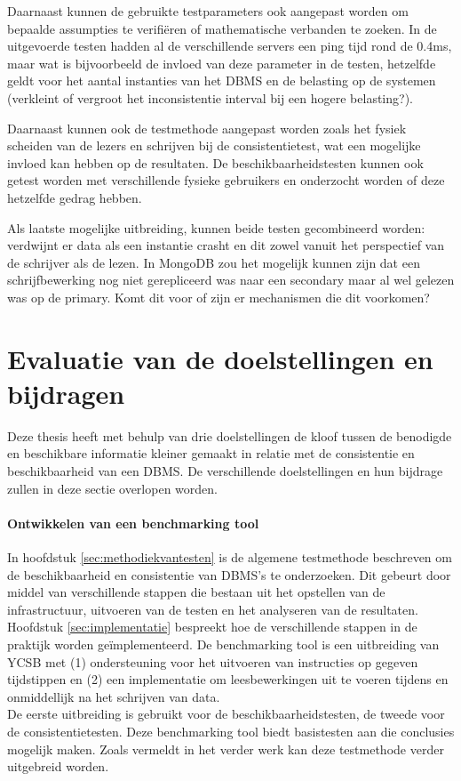 Daarnaast kunnen de gebruikte testparameters ook aangepast worden om bepaalde assumpties te verifiëren of mathematische verbanden te zoeken. In de uitgevoerde testen hadden al de verschillende servers een ping tijd rond de 0.4ms, maar wat is bijvoorbeeld de invloed van deze parameter in de testen, hetzelfde geldt voor het aantal instanties van het DBMS en de belasting op de systemen (verkleint of vergroot het inconsistentie interval bij een hogere belasting?). 

Daarnaast kunnen ook de testmethode aangepast worden zoals het fysiek scheiden van de lezers en schrijven bij de consistentietest, wat een mogelijke invloed kan hebben op de resultaten. De beschikbaarheidstesten kunnen ook getest worden met verschillende fysieke gebruikers en onderzocht worden of deze hetzelfde gedrag hebben. 

Als laatste mogelijke uitbreiding, kunnen beide testen gecombineerd worden: verdwijnt er data als een instantie crasht en dit zowel vanuit het perspectief van de schrijver als de lezen. In MongoDB zou het mogelijk kunnen zijn dat een schrijfbewerking nog niet gerepliceerd was naar een secondary maar al wel gelezen was op de primary. Komt dit voor of zijn er mechanismen die dit voorkomen?  

\section{Evaluatie van de doelstellingen en bijdragen}
Deze thesis heeft met behulp van drie doelstellingen de kloof tussen de benodigde en beschikbare informatie kleiner gemaakt in relatie met de consistentie en beschikbaarheid van een DBMS. De verschillende doelstellingen en hun bijdrage zullen in deze sectie overlopen worden. 

\paragraph{Ontwikkelen van een benchmarking tool} In hoofdstuk \ref{sec:methodiekvantesten} is de algemene testmethode beschreven om de beschikbaarheid en consistentie van DBMS's te onderzoeken. Dit gebeurt door middel van verschillende stappen die bestaan uit het opstellen van de infrastructuur, uitvoeren van de testen en het analyseren van de resultaten. Hoofdstuk \ref{sec:implementatie} bespreekt hoe de verschillende stappen in de praktijk worden geïmplementeerd. De benchmarking tool is een uitbreiding van YCSB\cite{cooper2010benchmarking} met (1) ondersteuning voor het uitvoeren van instructies op gegeven tijdstippen en (2) een implementatie om leesbewerkingen uit te voeren tijdens en onmiddellijk na het schrijven van data. \\
De eerste uitbreiding is gebruikt voor de beschikbaarheidstesten, de tweede voor de consistentietesten. Deze benchmarking tool biedt basistesten aan die conclusies mogelijk maken. Zoals vermeldt in het verder werk kan deze testmethode verder uitgebreid worden. 

